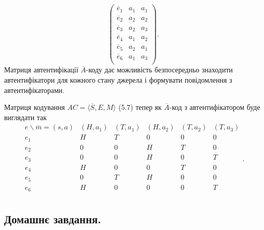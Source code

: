 \begin{example}
\begin{equation*}
\begin{pmatrix}
            \overline{e}_1 & a_1 & a_1 \\
            \overline{e}_2 & a_2 & a_2 \\
            \overline{e}_3 & a_2 & a_3 \\
            \overline{e}_4 & a_1 & a_2  \\
            \overline{e}_5 & a_2 & a_1  \\
            \overline{e}_6 & a_1 & a_3  \\
        \end{pmatrix}.
    \end{equation*}
    Матриця автентифікації $\overline{A}$-коду дає можливість безпосередньо знаходити
    автентифікатори для кожного стану джерела і формувати повідомлення з
    автентифікаторами.
    
    Матриця кодування $AC = \langle \overline{S}, E, M \rangle$ (5.7) тепер як $\overline{A}$-код з автентифікатором
    буде виглядати так
    \begin{equation*}
        \begin{matrix}
            e\backslash \overline{m} = (s, a) & (H, a_1) & (T, a_1) & (H, a_2) & (T, a_2) & (T, a_3) \\
            e_1 & H & T & 0 & 0 & 0 \\
            e_2 & 0 & 0 & H & T & 0 \\
            e_3 & 0 & 0 & H & 0 & T \\
            e_4 & H & 0 & 0 & T & 0 \\
            e_5 & 0 & T & H & 0 & 0 \\
            e_6 & H & 0 & 0 & 0 & T \\
        \end{matrix}.
    \end{equation*}
\end{example}

\subsection{Домашнє завдання.}

